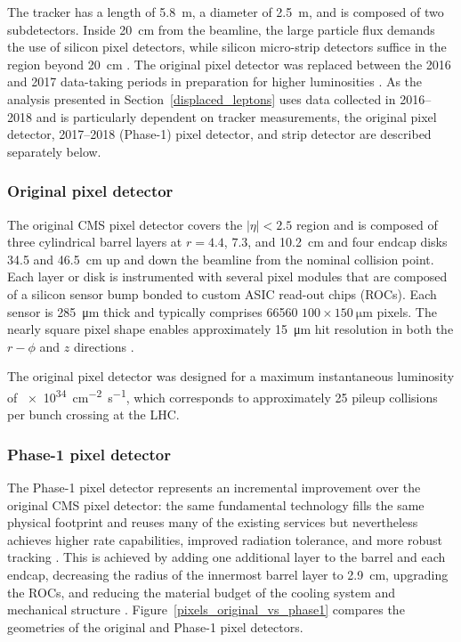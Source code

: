 
The tracker has a length of \SI{5.8}{\m}, a diameter of \SI{2.5}{\m}, and is composed of two subdetectors. Inside \SI{20}{\cm} from the beamline, the large particle flux demands the use of silicon pixel detectors, while silicon micro-strip detectors suffice in the region beyond \SI{20}{\cm} \cite{cms_experiment}. The original pixel detector was replaced between the 2016 and 2017 data-taking periods in preparation for higher luminosities \cite{cms_phase1_pixels}. As the analysis presented in Section~\ref{displaced_leptons} uses data collected in 2016--2018 and is particularly dependent on tracker measurements, the original pixel detector, 2017--2018 (Phase-1) pixel detector, and strip detector are described separately below. 

\subsubsection{Original pixel detector}
The original CMS pixel detector covers the $|\eta|<2.5$ region and is composed of three cylindrical barrel layers at $r=4.4$, $7.3$, and \SI{10.2}{\cm} and four endcap disks \num{34.5} and \SI{46.5}{\cm} up and down the beamline from the nominal collision point. Each layer or disk is instrumented with several pixel modules that are composed of a silicon sensor bump bonded to custom ASIC read-out chips (ROCs). Each sensor is \SI{285}{\um} thick and typically comprises 66560 $100\times\SI{150}{\um}$ pixels. The nearly square pixel shape enables approximately \SI{15}{\um} hit resolution in both the $r-\phi$ and $z$ directions \cite{cms_tdr_v1, cms_experiment}.

The original pixel detector was designed for a maximum instantaneous luminosity of \SI{e34}{\cm\tothe{-2}\s\tothe{-1}}, which corresponds to approximately 25 pileup collisions per bunch crossing at the LHC.


\subsubsection{Phase-1 pixel detector}
The Phase-1 pixel detector represents an incremental improvement over the original CMS pixel detector: the same fundamental technology fills the same physical footprint and reuses many of the existing services but nevertheless achieves higher rate capabilities, improved radiation tolerance, and more robust tracking \cite{cms_phase1_pixels}. This is achieved by adding one additional layer to the barrel and each endcap, decreasing the radius of the innermost barrel layer to \SI{2.9}{\cm}, upgrading the ROCs, and reducing the material budget of the cooling system and mechanical structure \cite{cms_phase1_pixels, cms_phase1_pixel_tdr}. Figure~\ref{pixels_original_vs_phase1} compares the geometries of the original and Phase-1 pixel detectors.

